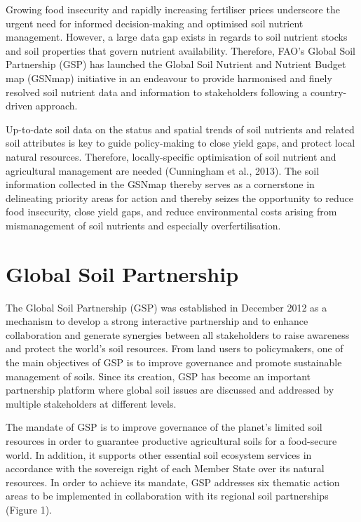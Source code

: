 \documentclass[
  10pt,
  b5paper,
  oneside]{book}
\begin{document}
Growing food insecurity and rapidly increasing fertiliser prices underscore the urgent need for informed decision-making and optimised soil nutrient management. However, a large data gap exists in regards to soil nutrient stocks and soil properties that govern nutrient availability. Therefore, FAO's Global Soil Partnership (GSP) has launched the Global Soil Nutrient and Nutrient Budget map (GSNmap) initiative in an endeavour to provide harmonised and finely resolved soil nutrient data and information to stakeholders following a country-driven approach.

Up-to-date soil data on the status and spatial trends of soil nutrients and related soil attributes is key to guide policy-making to close yield gaps, and protect local natural resources. Therefore, locally-specific optimisation of soil nutrient and agricultural management are needed (Cunningham et al., 2013). The soil information collected in the GSNmap thereby serves as a cornerstone in delineating priority areas for action and thereby seizes the opportunity to reduce food insecurity, close yield gaps, and reduce environmental costs arising from mismanagement of soil nutrients and especially overfertilisation.

\hypertarget{global-soil-partnership}{%
\section{Global Soil Partnership}\label{global-soil-partnership}}

The Global Soil Partnership (GSP) was established in December 2012 as a mechanism to develop a strong interactive partnership and to enhance collaboration and generate synergies between all stakeholders to raise awareness and protect the world's soil resources. From land users to policymakers, one of the main objectives of GSP is to improve governance and promote sustainable management of soils. Since its creation, GSP has become an important partnership platform where global soil issues are discussed and addressed by multiple stakeholders at different levels.

The mandate of GSP is to improve governance of the planet's limited soil resources in order to guarantee productive agricultural soils for a food-secure world. In addition, it supports other essential soil ecosystem services in accordance with the sovereign right of each Member State over its natural resources. In order to achieve its mandate, GSP addresses six thematic action areas to be implemented in collaboration with its regional soil partnerships (Figure 1).
\end{document}
